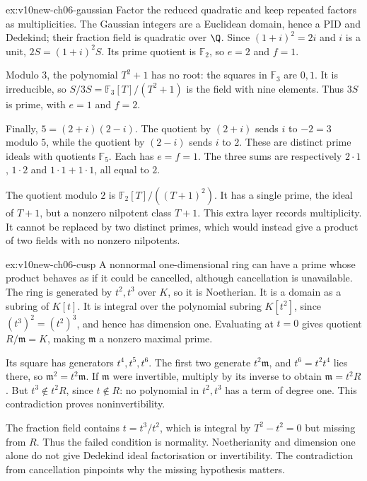 \begin{solution}{ex:v10new-ch06-gaussian}
\idea Factor the reduced quadratic and keep repeated factors as multiplicities.
\writeup The Gaussian integers are a Euclidean domain, hence a PID and Dedekind; their fraction field is quadratic over $\Q$. Since $(1+i)^2=2i$ and $i$ is a unit, $2S=(1+i)^2S$. Its prime quotient is $\mathbb F_2$, so $e=2$ and $f=1$.

Modulo $3$, the polynomial $T^2+1$ has no root: the squares in $\mathbb F_3$ are $0,1$. It is irreducible, so $S/3S=\mathbb F_3[T]/(T^2+1)$ is the field with nine elements. Thus $3S$ is prime, with $e=1$ and $f=2$.

Finally, $5=(2+i)(2-i)$. The quotient by $(2+i)$ sends $i$ to $-2=3$ modulo $5$, while the quotient by $(2-i)$ sends $i$ to $2$. These are distinct prime ideals with quotients $\mathbb F_5$. Each has $e=f=1$. The three sums are respectively $2\cdot1$, $1\cdot2$ and $1\cdot1+1\cdot1$, all equal to $2$.

The quotient modulo $2$ is $\mathbb F_2[T]/((T+1)^2)$. It has a single prime, the ideal of $T+1$, but a nonzero nilpotent class $T+1$. This extra layer records multiplicity. It cannot be replaced by two distinct primes, which would instead give a product of two fields with no nonzero nilpotents.
\end{solution}

\begin{solution}{ex:v10new-ch06-cusp}
\idea A nonnormal one-dimensional ring can have a prime whose product behaves as if it could be cancelled, although cancellation is unavailable.
\writeup The ring is generated by $t^2,t^3$ over $K$, so it is Noetherian. It is a domain as a subring of $K[t]$. It is integral over the polynomial subring $K[t^2]$, since $(t^3)^2=(t^2)^3$, and hence has dimension one. Evaluating at $t=0$ gives quotient $R/\mathfrak m=K$, making $\mathfrak m$ a nonzero maximal prime.

Its square has generators $t^4,t^5,t^6$. The first two generate $t^2\mathfrak m$, and $t^6=t^2t^4$ lies there, so $\mathfrak m^2=t^2\mathfrak m$. If $\mathfrak m$ were invertible, multiply by its inverse to obtain $\mathfrak m=t^2R$. But $t^3\notin t^2R$, since $t\notin R$: no polynomial in $t^2,t^3$ has a term of degree one. This contradiction proves noninvertibility.

The fraction field contains $t=t^3/t^2$, which is integral by $T^2-t^2=0$ but missing from $R$. Thus the failed condition is normality. Noetherianity and dimension one alone do not give Dedekind ideal factorisation or invertibility. The contradiction from cancellation pinpoints why the missing hypothesis matters.
\end{solution}

